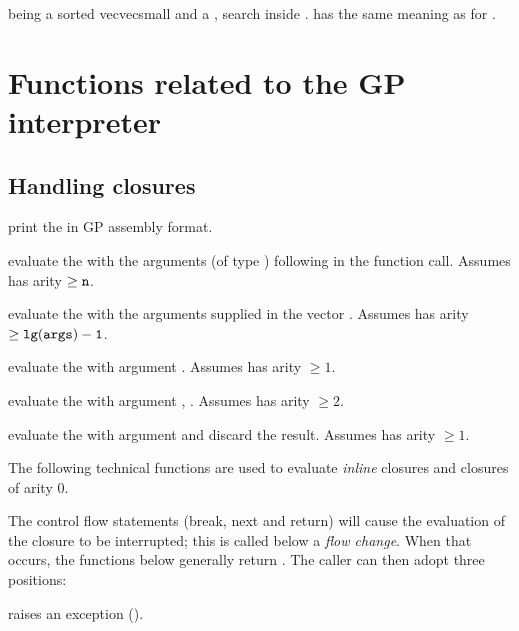   being a sorted
vecvecsmall and  a , search  inside .  has the same meaning as for .


\newpage
\chapter{Functions related to the GP interpreter}

\section{Handling closures}


 print the   in
GP assembly format.

 evaluate the 
 with the  arguments (of type ) following  in
the function call. Assumes  has arity $\geq {\tt n}$.

 evaluate the 
 with the arguments supplied in the vector . Assumes 
has arity $\geq {\tt lg(args)-1}$.

 evaluate the 
 with argument . Assumes  has arity $\geq 1$.

 evaluate the 
 with argument , . Assumes  has arity $\geq 2$.

 evaluate the 
 with argument  and discard the result. Assumes 
has arity $\geq 1$.

The following technical functions are used to evaluate \emph{inline}
closures and closures of arity 0.

The control flow statements (break, next and return) will cause the
evaluation of the closure to be interrupted; this is called below a
\emph{flow change}. When that occurs, the functions below generally
 return . The caller can then adopt three positions:

\item raises an exception ().

